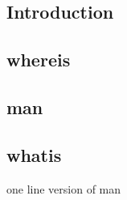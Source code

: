 
\subsection{Introduction}
 
\subsection{whereis}

\subsection{man}

\subsection{whatis}

one line version of man
